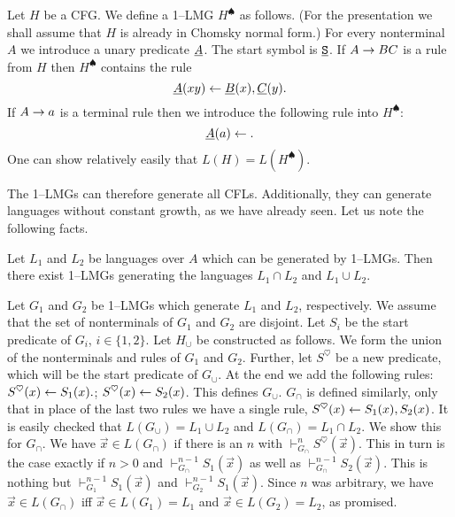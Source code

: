 Let $H$ be a CFG. We define a 1--LMG $H^{\spadesuit}$ as follows.  
(For the presentation we shall assume that $H$ is already in Chomsky 
normal form.) For every nonterminal $A$ we introduce a unary 
predicate $\underline{A}$. The start symbol is $\underline{\mbox{\tt S}}$.
If $A \rightarrow BC$ is a rule from $H$ then $H^{\spadesuit}$ contains the rule
\begin{equation}
\underline{A}(xy) \leftarrow \underline{B}(x),\underline{C}(y).
\end{equation}
If $A \rightarrow a$ is a terminal rule then we introduce the following 
rule into $H^{\spadesuit}$:
\begin{equation}
\underline{A}(a) \leftarrow .
\end{equation}
One can show relatively easily that $L(H) = L(H^{\spadesuit})$.

The 1--LMGs can therefore generate all CFLs.
Additionally, they can generate languages without constant
growth, as we have already seen. Let us note the following facts.
\begin{thm}
\label{thm:lbgschnitt}
Let $L_1$ and $L_2$ be languages over $A$ which can be generated
by 1--LMGs. Then there exist 1--LMGs generating the languages
$L_1 \cap L_2$ and $L_1 \cup L_2$.
\end{thm}
\proofbeg
Let $G_1$ and $G_2$ be 1--LMGs which generate $L_1$ and $L_2$,
respectively. We assume that the set of nonterminals of
$G_1$ and $G_2$ are disjoint. Let $S_i$
be the start predicate of $G_i$, $i \in \{1,2\}$.
Let $H_{\cup}$ be constructed as follows. We form the
union of the nonterminals and rules of $G_1$ and $G_2$.
Further, let $S^{\heartsuit}$ be a new
predicate, which will be the start predicate of $G_{\cup}$.
At the end we add the following rules:
$S^{\heartsuit}(x) \leftarrow S_1(x).$;
$S^{\heartsuit}(x) \leftarrow S_2(x)$.
This defines $G_{\cup}$. $G_{\cap}$ is defined similarly,
only that in place of the last two rules we have a single
rule, $S^{\heartsuit}(x) \leftarrow S_1(x), S_2(x)$. It is easily checked that
$L(G_{\cup}) = L_1 \cup L_2$ and $L(G_{\cap}) = L_1 \cap L_2$.
We show this for $G_{\cap}$. We have $\vec{x} \in L(G_{\cap})$
if there is an $n$ with $\vdash_{G_{\cap}}^n S^{\heartsuit}(\vec{x})$.  
This in turn is the case exactly if $n > 0$ and 
$\vdash_{G_{\cap}}^{n-1} S_1(\vec{x})$ as well as 
$\vdash_{G_{\cap}}^{n-1} S_2(\vec{x})$.  This is nothing but 
$\vdash_{G_1}^{n-1} S_1(\vec{x})$ and 
$\vdash_{G_2}^{n-1} S_1(\vec{x})$. Since $n$
was arbitrary, we have $\vec{x} \in L(G_{\cap})$ iff
$\vec{x} \in L(G_1) = L_1$ and $\vec{x} \in L(G_2) = L_2$,
as promised.
\proofend

